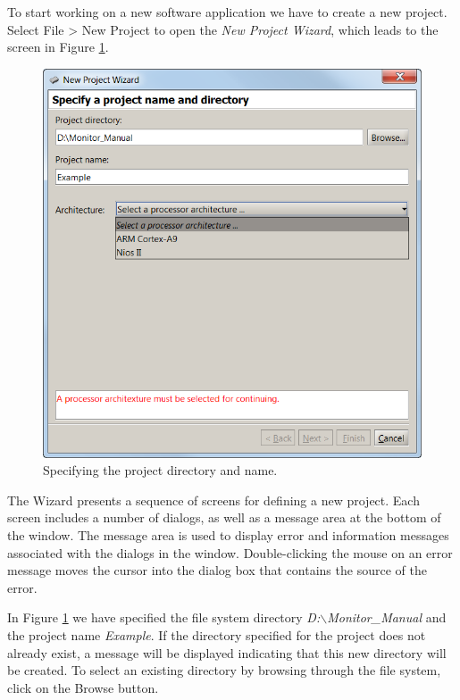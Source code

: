 \documentclass[11pt, twoside, pdftex]{article}
\begin{document}
To start working on a new software application we have
to create a new project. Select {\sf File > New Project} to open the {\it New Project Wizard}, which leads to the screen 
in Figure \ref{fig:NPW_directoryselect}. 

\begin{figure}[H]
   \begin{center}
      \includegraphics[scale=1]{screenshots/figure5.png}
   \end{center}
   \caption{Specifying the project directory and name.} 
   \label{fig:NPW_directoryselect}
\end{figure}


The Wizard presents a sequence of screens for
defining a new project. Each screen includes a number of dialogs, as well as a message area at the bottom of the window.  
The message area is used to display error and information messages associated with the dialogs in the window. 
Double-clicking the mouse on an error message moves the cursor
into the dialog box that contains the source of the error.


In Figure \ref{fig:NPW_directoryselect} we have specified the file system directory
{\it D:$\backslash$Monitor\_Manual} and the project 
name {\it Example}. 
If the directory specified for the project does not
already exist, a message will be displayed indicating that this
new directory will be created. To select an existing directory
by browsing through the file system, click on the {\sf Browse} button. 
\end{document}
